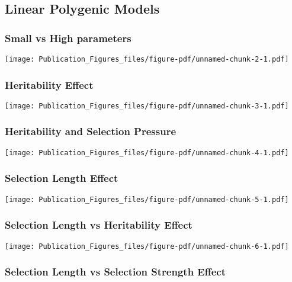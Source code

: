 \documentclass[
  letterpaper,
  DIV=11,
  numbers=noendperiod]{scrartcl}
\begin{document}
\hypertarget{linear-polygenic-models}{%
\subsection{Linear Polygenic Models}\label{linear-polygenic-models}}

\hypertarget{small-vs-high-parameters}{%
\subsubsection{Small vs High
parameters}\label{small-vs-high-parameters}}

\texttt{[image: Publication\_Figures\_files/figure-pdf/unnamed-chunk-2-1.pdf]}

\hypertarget{heritability-effect}{%
\subsubsection{Heritability Effect}\label{heritability-effect}}

\texttt{[image: Publication\_Figures\_files/figure-pdf/unnamed-chunk-3-1.pdf]}

\hypertarget{heritability-and-selection-pressure}{%
\subsubsection{Heritability and Selection
Pressure}\label{heritability-and-selection-pressure}}

\texttt{[image: Publication\_Figures\_files/figure-pdf/unnamed-chunk-4-1.pdf]}

\hypertarget{selection-length-effect}{%
\subsubsection{Selection Length Effect}\label{selection-length-effect}}

\texttt{[image: Publication\_Figures\_files/figure-pdf/unnamed-chunk-5-1.pdf]}

\hypertarget{selection-length-vs-heritability-effect}{%
\subsubsection{Selection Length vs Heritability
Effect}\label{selection-length-vs-heritability-effect}}

\texttt{[image: Publication\_Figures\_files/figure-pdf/unnamed-chunk-6-1.pdf]}

\hypertarget{selection-length-vs-selection-strength-effect}{%
\subsubsection{Selection Length vs Selection Strength
Effect}\label{selection-length-vs-selection-strength-effect}}
\end{document}
